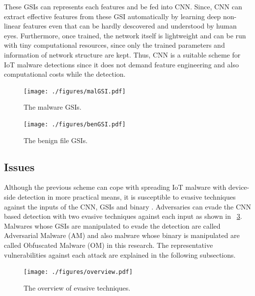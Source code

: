 \documentclass{ieeeaccess}
\begin{document}
These GSIs can represents each features and be fed into CNN.
Since, CNN can extract effective features from these GSI automatically by learning deep non-linear features even that can be hardly descovered and understood by human eyes.
Furthermore, once trained, the network itself is lightweight and can be run with tiny computational resources, since only the trained parameters and information of network structure are kept.
Thus, CNN is a suitable scheme for IoT malware detections since it does not demand feature engineering and also computational costs while the detection.

\begin{figure}[h]
 \centering
 \texttt{[image: ./figures/malGSI.pdf]}
 \caption{The malware GSIs.} 
 \label{fig:malGSI}
\end{figure}
\begin{figure}[h]
 \centering
 \texttt{[image: ./figures/benGSI.pdf]}
 \caption{The benign file GSIs.} 
 \label{fig:benGSI}
\end{figure}

\subsection{Issues} 
Although the previous scheme can cope with spreading IoT malware with device-side detection in more practical means, it is susceptible to evasive techniques against the inputs of the CNN, GSIs and binary \cite{attack1, attack2}.
Adversaries can evade the CNN based detection with two evasive techniques against each input as shown in \figurename~\ref{fig:ov}.
Malwares whose GSIs are manipulated to evade the detection are called Adversarial Malware (AM) and also malware whose binary is manipulated are called Obfuscated Malware (OM) in this research.  
The representative vulnerabilities against each attack are explained in the following subsections.

\begin{figure}[h]
 \centering
 \texttt{[image: ./figures/overview.pdf]}
 \caption{The overview of evasive techniques.} 
 \label{fig:ov}
\end{figure}
\end{document}
